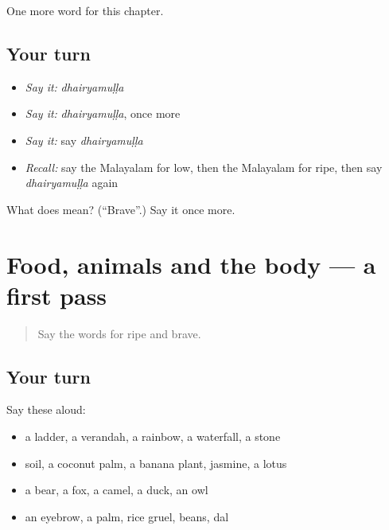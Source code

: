 \begin{grammarlens}[title={What you've built}]
One more word for this chapter.
\end{grammarlens}

\subsection*{Your turn}
\begin{itemize}
\raggedright
  \item \emph{Say it:} \emph{dhairyamuḷḷa}
  \item \emph{Say it:} \emph{dhairyamuḷḷa}, once more
  \item \emph{Say it:} say \emph{dhairyamuḷḷa}
  \item \emph{Recall:} say the Malayalam for low, then the Malayalam for ripe, then say \emph{dhairyamuḷḷa} again
\end{itemize}

\begin{tcolorbox}[breakable,colback=teal!4,colframe=teal!35!black,title={Before you move on}]
What does  mean? (\textquotedblleft{}Brave\textquotedblright{}.) Say it once more.
\end{tcolorbox}
\section[(dialogue)]{Food, animals and the body — a first pass}

\label{lesson:ML-R168-first-pass-food-animals-and-the-body}



\begin{quote}
Say the words for ripe and brave.
\end{quote}

\subsection*{Your turn}
Say these aloud:

\begin{itemize}
\raggedright
  \item a ladder, a verandah, a rainbow, a waterfall, a stone
  \item soil, a coconut palm, a banana plant, jasmine, a lotus
  \item a bear, a fox, a camel, a duck, an owl
  \item an eyebrow, a palm, rice gruel, beans, dal
\end{itemize}

